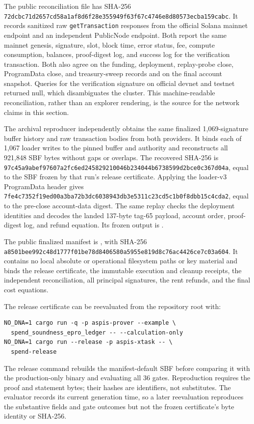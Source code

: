 The public reconciliation file
has SHA-256
\nolinkurl{72dcbc71d2657cd58a1af8d6f28e355949f63f67c4746e8d80573ecba159cabc}.
It records sanitized raw \texttt{getTransaction} responses from the official
Solana mainnet endpoint and an independent PublicNode endpoint.  Both report
the same mainnet genesis, signature, slot, block time, error status, fee,
compute consumption, balances, proof-digest log, and success log for the
verification transaction.  Both also agree on the funding, deployment,
replay-probe close, ProgramData close, and treasury-sweep records and on the
final account snapshot.  Queries for the verification signature on official
devnet and testnet returned null, which disambiguates the cluster.  This
machine-readable reconciliation, rather than an explorer rendering, is the
source for the network claims in this section.

The archival reproducer
 independently obtains the
same finalized 1,069-signature buffer history and raw transaction bodies from
both providers.  It binds each of 1,067 loader writes to the pinned buffer and
authority and reconstructs all 921,848 SBF bytes without gaps or overlaps.
The recovered SHA-256 is
\nolinkurl{97c45a9abef97607a2fc6ed245829210046b234044b6738599d2bce0c367d04a},
equal to the SBF frozen by that run's release certificate.  Applying the loader-v3 ProgramData header gives
\nolinkurl{7fe4c7352f19ed00a3ba72b3dc6038943db3e5311c23cd5c1b0f8dbb15c4cda2},
equal to the pre-close account-data digest.  The same replay checks the
deployment identities and decodes the landed 137-byte tag-65 payload, account
order, proof-digest log, and refund equation.  Its frozen output is
.

The public finalized manifest is
, with SHA-256
\nolinkurl{a8501bee992c48d1777f01be78d8406580a5955e819d8c76ac4426ce7c03a604}.
It contains no local absolute or operational filesystem paths or key material
and binds the release certificate,
the immutable execution and cleanup receipts, the independent reconciliation,
all principal signatures, the rent refunds, and the final cost equations.

The release certificate can be reevaluated from the repository root with:
\begin{verbatim}
NO_DNA=1 cargo run -q -p aspis-prover --example \
  spend_soundness_epro_ledger -- --calculation-only
NO_DNA=1 cargo run --release -p aspis-xtask -- \
  spend-release
\end{verbatim}
The release command rebuilds the manifest-default SBF before comparing it
with the production-only binary and evaluating all 36 gates.  Reproduction
requires the proof and statement bytes; their hashes are identifiers, not
substitutes.  The evaluator records its current generation time, so a later
reevaluation reproduces the substantive fields and gate outcomes but not the
frozen certificate's byte identity or SHA-256.
